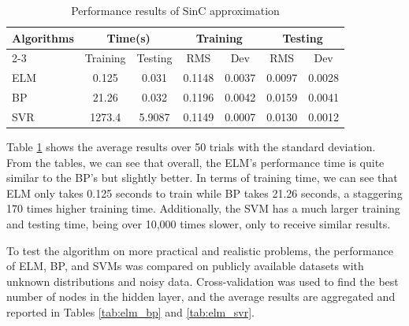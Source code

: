 \documentclass[12pt]{article}
\begin{document}
\begin{table}[h]
\centering
\caption{Performance results of SinC approximation}
\label{tab:sinc_res}
\begin{tabular}{@{}lcccccc@{}}
\hline
Algorithms & \multicolumn{2}{c}{Time(s)} & \multicolumn{2}{c}{Training} & \multicolumn{2}{c}{Testing}\\
\cline{2-3} \cline{4-5} \cline{6-7}
 & Training & Testing & RMS & Dev & RMS & Dev \\
\hline
ELM & 0.125 & 0.031 & 0.1148 & 0.0037 & 0.0097 & 0.0028\\
BP & 21.26 & 0.032 & 0.1196 & 0.0042 & 0.0159 & 0.0041\\
SVR & 1273.4 & 5.9087 & 0.1149 & 0.0007 & 0.0130 & 0.0012\\
\hline
\end{tabular}
\end{table}

Table \ref{tab:sinc_res} shows the average results over 50 trials with the standard deviation. From the tables, we can see that overall, the ELM's performance time is quite similar to the BP's but slightly better. In terms of training time, we can see that ELM only takes 0.125 seconds to train while BP takes 21.26 seconds, a staggering 170 times higher training time. Additionally, the SVM has a much larger training and testing time, being over 10,000 times slower, only to receive similar results.

To test the algorithm on more practical and realistic problems, the performance of ELM, BP, and SVMs was compared on publicly available datasets with unknown distributions and noisy data. Cross-validation was used to find the best number of nodes in the hidden layer, and the average results are aggregated and reported in Tables \ref{tab:elm_bp} and \ref{tab:elm_svr}.
\end{document}
